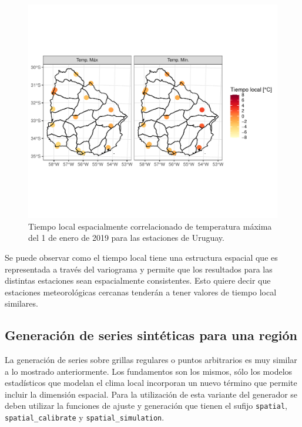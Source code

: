 \documentclass[
  12pt]{article}
\begin{document}
\begin{figure}[H]

{\centering \includegraphics{Manual_Generador_files/figure-latex/campo-temp-uy-local-1} 

}

\caption{Tiempo local espacialmente correlacionado de temperatura máxima del 1 de enero de 2019 para las estaciones de Uruguay.}\label{fig:campo-temp-uy-local}
\end{figure}

Se puede observar como el tiempo local tiene una estructura espacial que es representada a través del variograma y permite que los resultados para las distintas estaciones sean espacialmente consistentes. Esto quiere decir que estaciones meteorológicas cercanas tenderán a tener valores de tiempo local similares.

\hypertarget{generaciuxf3n-de-series-sintuxe9ticas-para-una-regiuxf3n}{%
\subsection{Generación de series sintéticas para una región}\label{generaciuxf3n-de-series-sintuxe9ticas-para-una-regiuxf3n}}

La generación de series sobre grillas regulares o puntos arbitrarios es muy similar a lo mostrado anteriormente. Los fundamentos son los mismos, sólo los modelos estadísticos que modelan el clima local incorporan un nuevo término que permite incluir la dimensión espacial. Para la utilización de esta variante del generador se deben utilizar la funciones de ajuste y generación que tienen el sufijo \texttt{spatial}, \texttt{spatial\_calibrate} y \texttt{spatial\_simulation}.
\end{document}
